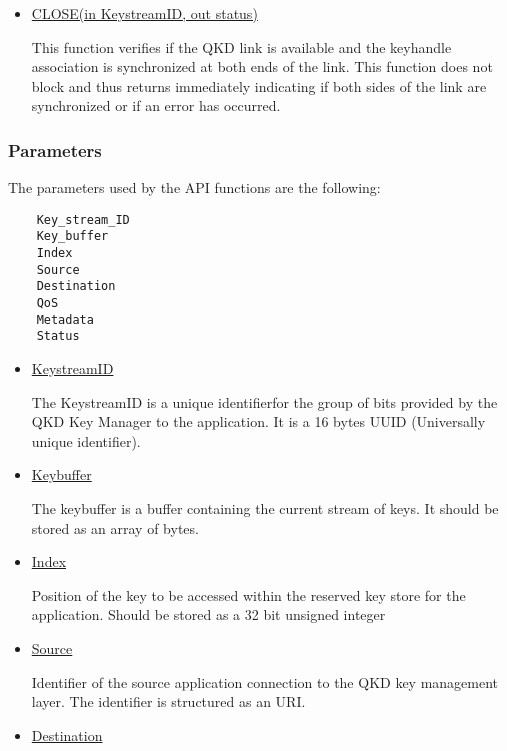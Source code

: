 \begin{refsection}
\begin{itemize}
	\item\underline{CLOSE(in Key\textunderscore stream\textunderscore ID, out status)}
	
		This function verifies if the QKD link is available and the key\textunderscore handle association is synchronized at both ends of the link. This function does not block and thus returns immediately indicating if both sides of the link are synchronized or if an error has occurred.
			
\end{itemize}

\subsubsection{Parameters}

The parameters used by the API functions are the following:

\begin{lstlisting}
	Key_stream_ID
	Key_buffer
	Index
	Source
	Destination
	QoS
	Metadata
	Status
\end{lstlisting}

\begin{itemize}
	
	\item\underline{Key\textunderscore stream\textunderscore ID}
		
		The Key\textunderscore stream\textunderscore ID is a unique identifierfor the group of bits provided by the QKD Key Manager to the application. It is a 16 bytes UUID (Universally unique identifier).
	
	\item\underline{Key\textunderscore buffer}
	
		The key\textunderscore buffer is a buffer containing the current stream of keys. It should be stored as an array of bytes.
		
	\item\underline{Index}
	
		Position of the key to be accessed within the reserved key store for the application. Should be stored as a 32 bit unsigned integer
		
	\item\underline{Source}
	
		Identifier of the source application connection to the QKD key management layer. The identifier is structured as an URI.
		
	\item\underline{Destination}
	

\end{itemize}
\end{refsection}
